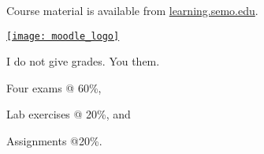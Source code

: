 \documentclass[t]{beamer}
\newcommand{\btVFill}{\vskip0pt plus 1filll}
\begin{document}
%
\begin{frame}[t]{Course material is available from \href{http://learning.semo.edu}{learning.semo.edu}.}
	\begin{center}
		
		\href{http://learning.semo.edu}{\texttt{[image: moodle\_logo]}}
		
		\medskip
		
	\end{center}
	
\end{frame}
%
\begin{frame}[t]{I do not give grades. You  them.}

	\hangpara Four exams @ 60\%,

	\hangpara Lab exercises @ 20\%, and

	\hangpara Assignments @20\%.

\end{frame}
%

%
%
%
%
%



{
\begin{frame}[b]
\end{frame}
}


%
%
%
\end{document}
